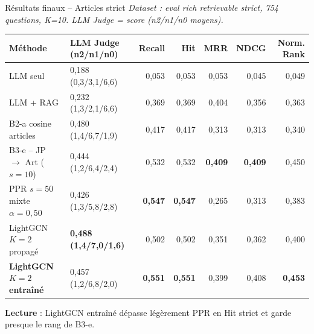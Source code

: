 \documentclass[aspectratio=169,10pt]{beamer}
\begin{document}
\begin{frame}{Résultats finaux -- Articles strict}
  \tiny
  \textit{Dataset : eval rich retrievable strict, 754 questions, K=10. LLM Judge = score (n2/n1/n0 moyens).}

  \vspace{0.25em}
  \renewcommand{\arraystretch}{1.08}
  \setlength{\tabcolsep}{4pt}
  \begin{center}
  \begin{tabular}{@{}l l r r r r r@{}}
    \toprule
    \textbf{Méthode} & \textbf{LLM Judge (n2/n1/n0)}
     & Recall & Hit & MRR & NDCG & Norm. Rank \\
    \midrule
    LLM seul
     & 0,188 (0,3/3,1/6,6)
     & 0,053 & 0,053 & 0,053 & 0,045 & 0,049 \\
    LLM + RAG
     & 0,232 (1,3/2,1/6,6)
     & 0,369 & 0,369 & 0,404 & 0,356 & 0,363 \\
    \midrule
    B2-a cosine articles
     & 0,480 (1,4/6,7/1,9)
     & 0,417 & 0,417 & 0,313 & 0,313 & 0,340 \\
    \rowcolor{accentsoft}
    B3-e -- JP $\to$ Art ($s{=}10$)
     & 0,444 (1,2/6,4/2,4)
     & 0,532 & 0,532 & \textbf{0,409} & \textbf{0,409} & 0,450 \\
    PPR $s{=}50$ mixte $\alpha=0{,}50$
     & 0,426 (1,3/5,8/2,8)
     & \textbf{0,547} & \textbf{0,547} & 0,265 & 0,313 & 0,383 \\
    \midrule
    LightGCN $K{=}2$ propagé
     & \textbf{0,488 (1,4/7,0/1,6)}
     & 0,502 & 0,502 & 0,351 & 0,362 & 0,400 \\
    \rowcolor{green!10}
    \textbf{LightGCN $K{=}2$ entraîné}
     & 0,457 (1,2/6,8/2,0)
     & \textbf{0,551} & \textbf{0,551} & 0,399 & 0,408 & \textbf{0,453} \\
    \bottomrule
  \end{tabular}
  \end{center}

  \vspace{0.25em}
  {\scriptsize \textbf{Lecture} : LightGCN entraîné dépasse légèrement PPR en Hit strict
  et garde presque le rang de B3-e.}
\end{frame}
\end{document}
